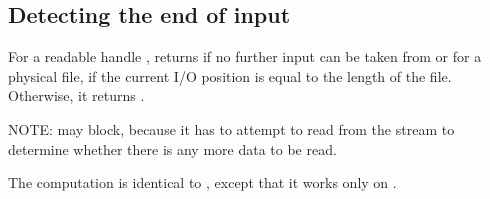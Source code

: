 \subsection{Detecting the end of input}
\begin{haddockdesc}
\item[\begin{tabular}{@{}l}
hIsEOF :: Handle -> IO Bool
\end{tabular}]
{\haddockbegindoc
For a readable handle ,   returns
  if no further input can be taken from  or for a
 physical file, if the current I/O position is equal to the length of
 the file.  Otherwise, it returns .\par
NOTE:  may block, because it has to attempt to read from
 the stream to determine whether there is any more data to be read.\par}
\end{haddockdesc}
\begin{haddockdesc}
\item[\begin{tabular}{@{}l}
isEOF :: IO Bool
\end{tabular}]
{\haddockbegindoc
The computation  is identical to ,
 except that it works only on .\par}
\end{haddockdesc}
